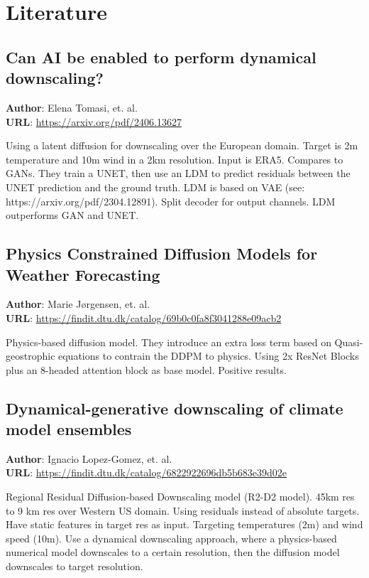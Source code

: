 \section*{Literature}

\subsection*{Can AI be enabled to perform dynamical downscaling?}
\textbf{Author}: Elena Tomasi, et. al. \\
\textbf{URL}: \hyperlink{arxiv} {https://arxiv.org/pdf/2406.13627}

Using a latent diffusion for downscaling over the European domain. Target is 2m temperature and 10m wind in a 2km resolution. Input is ERA5. Compares to GANs.
They train a UNET, then use an LDM to predict residuals between the UNET prediction and the ground truth. LDM is based on VAE (see: https://arxiv.org/pdf/2304.12891). Split decoder for output channels. LDM outperforms GAN and UNET.


\subsection*{Physics Constrained Diffusion Models for
Weather Forecasting}
\textbf{Author}: Marie Jørgensen, et. al. \\
\textbf{URL}: \hyperlink{findit}{https://findit.dtu.dk/catalog/69b0c0fa8f3041288e09acb2}

Physics-based diffusion model. They introduce an extra loss term based on Quasi-geostrophic equations to contrain the DDPM to physics. Using 2x ResNet Blocks plus an 8-headed attention block as base model. Positive results.

\subsection*{Dynamical-generative downscaling of climate model ensembles}
\textbf{Author}: Ignacio Lopez-Gomez, et. al. \\
\textbf{URL}: \hyperlink{findit}{https://findit.dtu.dk/catalog/6822922696db5b683e39d02e}

Regional Residual Diffusion-based Downscaling model (R2-D2 model). 45km res to 9 km res over Western US domain. Using residuals instead of absolute targets. Have static features in target res as input. Targeting temperatures (2m) and wind speed (10m). Use a dynamical downscaling approach, where a physics-based numerical model downscales to a certain resolution, then the diffusion model downscales to target resolution.

